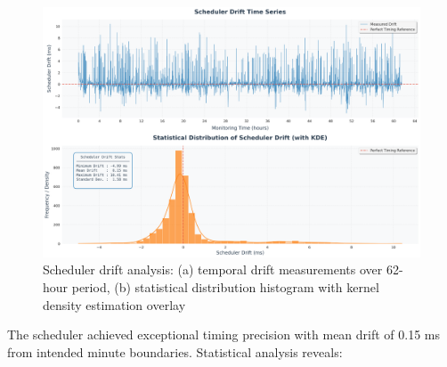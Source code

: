 \documentclass[12pt,a4paper]{article}
\begin{document}
\begin{figure}[H]
    \centering
    \includegraphics[width=\textwidth]{../plots/62-hours/scheduler_timing_drift_performance.png}
    \caption{Scheduler drift analysis: (a) temporal drift measurements over 62-hour period, (b) statistical distribution histogram with kernel density estimation overlay}
    \label{fig:scheduler_drift}
\end{figure}

The scheduler achieved exceptional timing precision with mean drift of 0.15 ms from intended minute boundaries. Statistical analysis reveals:
\end{document}
